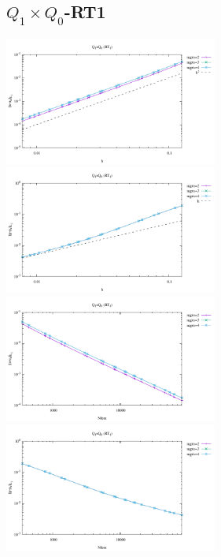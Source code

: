 \subsection*{$Q_1\times Q_0$-RT1}
\begin{center}
\includegraphics[width=7cm]{python_codes/fieldstone_120/results/RT1Q0-velocity-h.pdf}
\includegraphics[width=7cm]{python_codes/fieldstone_120/results/RT1Q0-pressure-h.pdf}
\includegraphics[width=7cm]{python_codes/fieldstone_120/results/RT1Q0-velocity-Nfem.pdf}
\includegraphics[width=7cm]{python_codes/fieldstone_120/results/RT1Q0-pressure-Nfem.pdf}
\end{center}

